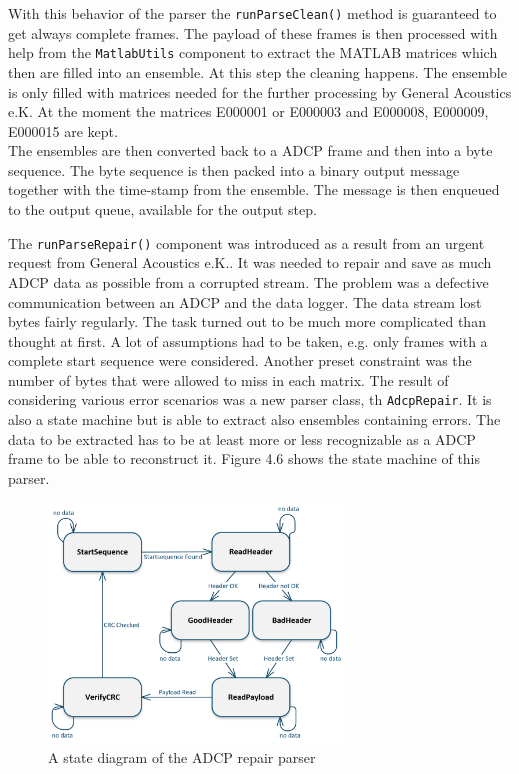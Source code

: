With this behavior of the parser the \texttt{runParseClean()} method is  guaranteed to get always complete frames. The payload of these frames is then processed with help from the \texttt{MatlabUtils} component to extract the MATLAB matrices which then are filled into an ensemble. At this step the cleaning happens. The ensemble is only filled with matrices needed for the further processing by General Acoustics e.K. At the moment the matrices E000001 or E000003 and E000008, E000009, E000015 are kept.\\
The ensembles are then converted back to a ADCP frame and then into a byte sequence. The byte sequence is then packed into a binary output message together with the time-stamp from the ensemble. The message is then enqueued to the output queue, available for the output step.

The \texttt{runParseRepair()} component was introduced as a result from an urgent request from General Acoustics e.K.. It was needed to repair and save as much ADCP data as possible from a corrupted stream. The problem was a defective communication between an ADCP and the data logger. The data stream lost bytes fairly regularly.
The task turned out to be much more complicated than thought at first. A lot of assumptions had to be taken, e.g. only frames with a complete start sequence were considered. Another preset constraint was the number of bytes that were allowed to miss in each matrix. The result of considering various error scenarios was a new parser class, th \texttt{AdcpRepair}. It is also a state machine but is able to extract also ensembles containing errors. The data to be extracted has to be at least more or less recognizable as a ADCP frame to be able to reconstruct it. Figure 4.6 shows the state machine of this parser.

\begin{figure}[h]
\centering
      \includegraphics[width=0.7\textwidth]{repair}
        \caption{A state diagram of the ADCP repair parser}
\end{figure}

